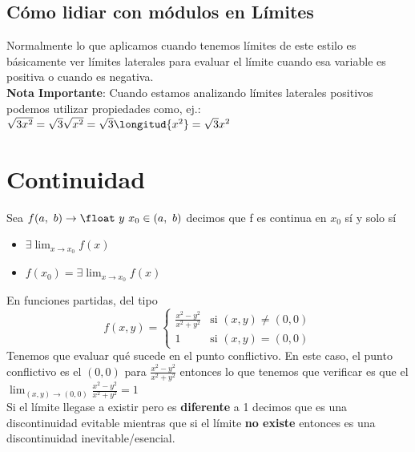\documentclass[10pt,a4paper]{article}
\begin{document}
\subsection*{Cómo lidiar con módulos en Límites}
Normalmente lo que aplicamos cuando tenemos límites de este estilo es básicamente ver límites laterales para evaluar el límite cuando esa variable es positiva o cuando es negativa. \\
\textbf{Nota Importante}: Cuando estamos analizando límites laterales positivos podemos utilizar propiedades como, ej.: $\sqrt{3x^{2}} = \sqrt{3} \sqrt{x^{2}} = \sqrt{3} \longitud{x^{2}} = \sqrt{3} x^{2}$
\section*{Continuidad}
Sea $f(a, \ b) \rightarrow \float \ y \ x_{0} \in (a, \ b)$ decimos que f es continua en $x_{0}$ sí y solo sí 
\begin{itemize}
    \item $\exists \lim_{x\to x_{0}} f(x) $
    \item $f(x_{0}) = \exists \lim_{x\to x_{0}} f(x) $
\end{itemize}
En funciones partidas, del tipo
\[
f(x, y) =
\begin{cases}
\frac{x^2-y^2}{x^2+y^2} & \text{si } (x, y) \neq (0, 0) \\
1 & \text{si } (x, y) = (0, 0)
\end{cases}
\]
Tenemos que evaluar qué sucede en el punto conflictivo. En este caso, el punto conflictivo es el $(0,0)$ para $\frac{x^2-y^2}{x^2+y^2}$ entonces lo que tenemos que verificar es que el $\lim_{(x,y) \to (0,0)} \frac{x^2-y^2}{x^2+y^2} = 1 $ \\
Si el límite llegase a existir pero es \textbf{diferente} a 1 decimos que es una discontinuidad evitable mientras que si el límite \textbf{no existe} entonces es una discontinuidad inevitable/esencial.
\end{document}
